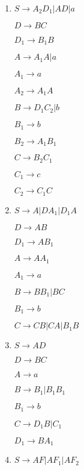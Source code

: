 \begin{question}

    \begin{enumerate}[label=\textbf{\alph*})]
        \item 

        $S \rightarrow A_2D_1 | AD | a $

        $D \rightarrow BC $

        $D_1 \rightarrow B_1B $
  
        $A \rightarrow A_1A | a $

        $A_1 \rightarrow a $

        $A_2 \rightarrow A_1A $
    
        $B \rightarrow D_1C_2 | b $ 

        $B_1 \rightarrow b $

        $B_2 \rightarrow A_1B_1 $

        $C \rightarrow B_2C_1 $

        $C_1 \rightarrow c $

        $C_2 \rightarrow C_1C $

        \item

        $S \rightarrow A | DA_1 | D_1A $

        $D \rightarrow AB $

        $D_1 \rightarrow AB_1 $
  
        $A \rightarrow AA_1  $

        $A_1 \rightarrow a $
    
        $B \rightarrow BB_1 | BC $

        $B_1 \rightarrow b $

        $C \rightarrow CB | CA | B_1B $ 

        \item 

        $S \rightarrow AD $

        $D \rightarrow BC $
  
        $A \rightarrow a $
    
        $B \rightarrow B_1 | B_1B_1 $

        $B_1 \rightarrow b $

        $C \rightarrow D_1B | C_1 $ 

        $D_1 \rightarrow BA_1 $

        \item 

        $S \rightarrow AF | AF_1 | AF_2 $


\end{enumerate}
\end{question}
